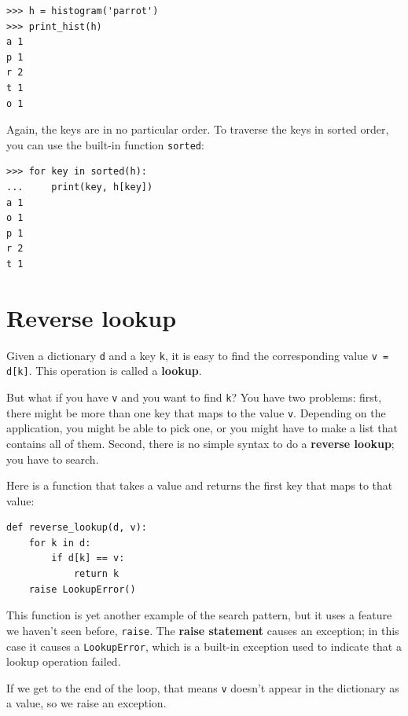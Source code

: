\documentclass[10pt]{book}
\begin{document}
\begin{verbatim}
>>> h = histogram('parrot')
>>> print_hist(h)
a 1
p 1
r 2
t 1
o 1
\end{verbatim}
%
Again, the keys are in no particular order.  To traverse the keys
in sorted order, you can use the built-in function {\tt sorted}:

\begin{verbatim}
>>> for key in sorted(h):
...     print(key, h[key])
a 1
o 1
p 1
r 2
t 1
\end{verbatim}



\section{Reverse lookup}
\label{raise}

Given a dictionary {\tt d} and a key {\tt k}, it is easy to
find the corresponding value {\tt v = d[k]}.  This operation
is called a {\bf lookup}.

But what if you have {\tt v} and you want to find {\tt k}?
You have two problems: first, there might be more than one
key that maps to the value {\tt v}.  Depending on the application,
you might be able to pick one, or you might have to make
a list that contains all of them.  Second, there is no
simple syntax to do a {\bf reverse lookup}; you have to search.

Here is a function that takes a value and returns the first
key that maps to that value:

\begin{verbatim}
def reverse_lookup(d, v):
    for k in d:
        if d[k] == v:
            return k
    raise LookupError()
\end{verbatim}
%
This function is yet another example of the search pattern, but it
uses a feature we haven't seen before, {\tt raise}.  The 
{\bf raise statement} causes an exception; in this case it causes a
{\tt LookupError}, which is a built-in exception used to indicate
that a lookup operation failed.
  
 

If we get to the end of the loop, that means {\tt v}
doesn't appear in the dictionary as a value, so we raise an
exception.
\end{document}
